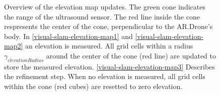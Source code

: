 \begin{figure}[htb!]
  \begin{center}
 \end{center}
  \caption{Overview of the elevation map updates. The green cone indicates the range of the ultrasound sensor. The red line inside the cone respresents the center of the cone, perpendicular to the AR.Drone's body. In \ref{visual-slam-elevation-map1} and \ref{visual-slam-elevation-map2} an elevation is measured. All grid cells within a radius $\gamma_{elevationRadius}$ around the center of the cone (red line) are updated to store the measured elevation. \ref{visual-slam-elevation-map3} Describes the refinement step. When no elevation is measured, all grid cells within the cone (red cubes) are resetted to zero elevation.}
  \label{visual-slam-elevation-map}
\end{figure}